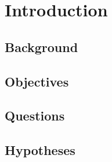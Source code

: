 
\chapter{Introduction}
\label{chap:Int}

\section{Background}

\section{Objectives}

\section{Questions}

\section{Hypotheses}